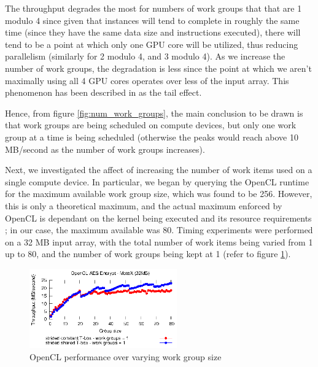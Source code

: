 \documentclass[conference,10pt]{IEEEtran}
\begin{document}
The throughput degrades the most for numbers of work groups that that are 1 modulo 4 since given 
that instances will tend to complete in roughly the same time (since they have the same data size 
and instructions executed), there will tend to be a point at which only one GPU core will be 
utilized, thus reducing parallelism (similarly for 2 modulo 4, and 3 modulo 4). As we increase the 
number of work groups, the degradation is less since the point at which we aren't maximally using 
all 4 GPU cores operates over less of the input array.  This phenomenon has been described in 
\cite{gpu_opt} as the tail effect.

Hence, from figure \ref{fig:num_work_groups}, the main conclusion to be drawn is that work groups 
are being scheduled on compute devices, but only one work group at a time is being scheduled 
(otherwise the peaks would reach above 10 MB/second as the number of work groups increases).

Next, we investigated the affect of increasing the number of work items used on a single compute 
device.  In particular, we began by querying the OpenCL runtime for the maximum available work group 
size, which was found to be 256.  However, this is only a theoretical maximum, and the actual 
maximum enforced by OpenCL is dependant on the kernel being executed and its resource requirements 
\cite{opencl_guide}; in our case, the maximum available was 80.  Timing experiments were performed 
on a 32 MB input array, with the total number of work items being varied from 1 up to 80, and the 
number of work groups being kept at 1 (refer to figure \ref{fig:work_group_size}).

\begin{figure}[!t]
\centering
\includegraphics[width=2.5in]{../final/motox/4.2/opencl_aes_group_size.constant_tbox.shared_tbox.eps}
\caption{OpenCL performance over varying work group size}
\label{fig:work_group_size}
\end{figure}
\end{document}

